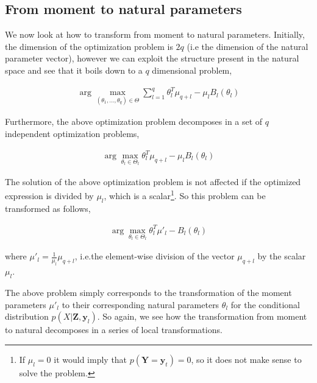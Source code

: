 \documentclass[11pt, oneside]{article}   	%
\newcommand{\bm}{\mathbf}
\numberwithin{figure}{section}
\numberwithin{equation}{section}
\numberwithin{table}{section}
\theoremstyle{definition}
\begin{document}
\subsection{From moment to natural parameters} \label{Section:CD_With_MParents:MomentToNatural}

We now look at how to transform from moment to natural parameters. Initially, the dimension of the optimization problem is $2q$ (i.e the dimension of the natural parameter vector), however we can exploit the structure present in the natural space and see that it boils down to a $q$ dimensional problem, 

\begin{eqnarray*}
\arg\max_{(\theta_1,\ldots, \theta_q) \in \Theta} \sum_{l=1}^q \theta_l^T \mu_{q+l}- \mu_l B_l(\theta_l)
\end{eqnarray*}

Furthermore, the above optimization problem decomposes in a set of $q$ independent optimization problems, 

\begin{eqnarray*}
\arg\max_{\theta_l \in \Theta_l} \theta_l^T \mu_{q+l}- \mu_l B_l(\theta_l)
\end{eqnarray*}

The solution of the above optimization problem is not affected if the optimized expression is divided by $\mu_l$, which is a scalar\footnote{If $\mu_l=0$ it would imply that $p(\bm Y= \bm y_t)=0$, so it does not make sense to solve the problem.}. So this problem can be transformed as follows, 

\begin{eqnarray}
\label{Equation:CD_With_MParents:MomentToNatural}
\arg\max_{\theta_l \in \Theta_l} \theta_l^T\mu'_l - B_l(\theta_l)
\end{eqnarray}

\noindent where $\mu'_l =\frac{1}{\mu_{l}}\mu_{q+l}$, i.e.the element-wise division of the vector $\mu_{q+l}$ by the scalar $\mu_l$.

The above problem simply corresponds to the transformation of the moment parameters $\mu'_l$ to their corresponding natural parameters $\theta_l$ for the conditional distribution $p(X|\bm Z, \bm y_l)$. So again, we see how the transformation from moment to natural decomposes in a series of local transformations. 

\end{document}
